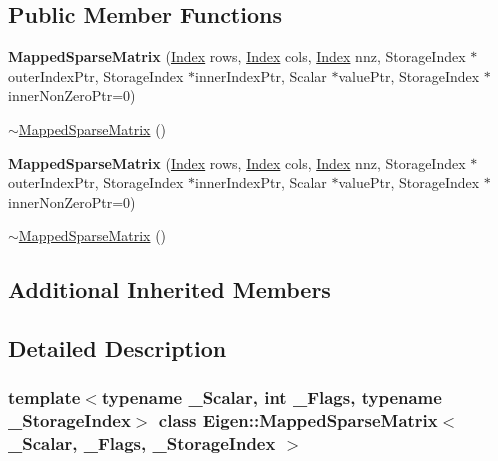 \subsection*{Public Member Functions}
\begin{DoxyCompactItemize}
\item 
\mbox{\label{class_eigen_1_1_mapped_sparse_matrix_a126bf868e2a441dd0d677805c2de1fa8}} 
{\bfseries Mapped\+Sparse\+Matrix} (\hyperlink{namespace_eigen_a62e77e0933482dafde8fe197d9a2cfde}{Index} rows, \hyperlink{namespace_eigen_a62e77e0933482dafde8fe197d9a2cfde}{Index} cols, \hyperlink{namespace_eigen_a62e77e0933482dafde8fe197d9a2cfde}{Index} nnz, Storage\+Index $\ast$outer\+Index\+Ptr, Storage\+Index $\ast$inner\+Index\+Ptr, Scalar $\ast$value\+Ptr, Storage\+Index $\ast$inner\+Non\+Zero\+Ptr=0)
\item 
\hyperlink{class_eigen_1_1_mapped_sparse_matrix_a0c36a53853f1659ea59447bcb9a20799}{$\sim$\+Mapped\+Sparse\+Matrix} ()
\item 
\mbox{\label{class_eigen_1_1_mapped_sparse_matrix_a126bf868e2a441dd0d677805c2de1fa8}} 
{\bfseries Mapped\+Sparse\+Matrix} (\hyperlink{namespace_eigen_a62e77e0933482dafde8fe197d9a2cfde}{Index} rows, \hyperlink{namespace_eigen_a62e77e0933482dafde8fe197d9a2cfde}{Index} cols, \hyperlink{namespace_eigen_a62e77e0933482dafde8fe197d9a2cfde}{Index} nnz, Storage\+Index $\ast$outer\+Index\+Ptr, Storage\+Index $\ast$inner\+Index\+Ptr, Scalar $\ast$value\+Ptr, Storage\+Index $\ast$inner\+Non\+Zero\+Ptr=0)
\item 
\hyperlink{class_eigen_1_1_mapped_sparse_matrix_a0c36a53853f1659ea59447bcb9a20799}{$\sim$\+Mapped\+Sparse\+Matrix} ()
\end{DoxyCompactItemize}
\subsection*{Additional Inherited Members}


\subsection{Detailed Description}
\subsubsection*{template$<$typename \+\_\+\+Scalar, int \+\_\+\+Flags, typename \+\_\+\+Storage\+Index$>$\newline
class Eigen\+::\+Mapped\+Sparse\+Matrix$<$ \+\_\+\+Scalar, \+\_\+\+Flags, \+\_\+\+Storage\+Index $>$}

